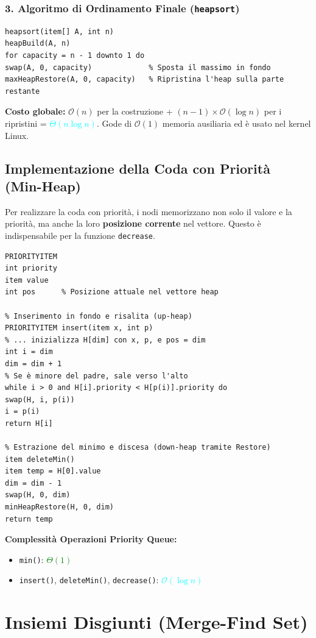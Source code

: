 \documentclass[12pt, a4paper]{article}
\begin{document}
\subsubsection{3. Algoritmo di Ordinamento Finale (\texttt{heapsort})}
\begin{verbatim}
heapsort(item[] A, int n)
heapBuild(A, n)
for capacity = n - 1 downto 1 do
swap(A, 0, capacity)             % Sposta il massimo in fondo
maxHeapRestore(A, 0, capacity)   % Ripristina l'heap sulla parte restante
\end{verbatim}
\textbf{Costo globale:} $\mathcal{O}(n)$ per la costruzione + $(n-1) \times \mathcal{O}(\log n)$ per i ripristini = \textcolor{cyan}{$\Theta(n \log n)$}. Gode di $\mathcal{O}(1)$ memoria ausiliaria ed è usato nel kernel Linux.

\subsection{Implementazione della Coda con Priorità (Min-Heap)}
Per realizzare la coda con priorità, i nodi memorizzano non solo il valore e la priorità, ma anche la loro \textbf{posizione corrente} nel vettore. Questo è indispensabile per la funzione \texttt{decrease}.

\begin{verbatim}
PRIORITYITEM
int priority
item value
int pos      % Posizione attuale nel vettore heap

% Inserimento in fondo e risalita (up-heap)
PRIORITYITEM insert(item x, int p)
% ... inizializza H[dim] con x, p, e pos = dim
int i = dim
dim = dim + 1
% Se è minore del padre, sale verso l'alto
while i > 0 and H[i].priority < H[p(i)].priority do
swap(H, i, p(i))
i = p(i)
return H[i]

% Estrazione del minimo e discesa (down-heap tramite Restore)
item deleteMin()
item temp = H[0].value
dim = dim - 1
swap(H, 0, dim)
minHeapRestore(H, 0, dim)
return temp
\end{verbatim}
\textbf{Complessità Operazioni Priority Queue:}
\begin{itemize}
\item \texttt{min()}: \textcolor{green}{$\Theta(1)$}
\item \texttt{insert()}, \texttt{deleteMin()}, \texttt{decrease()}: \textcolor{cyan}{$\mathcal{O}(\log n)$}
\end{itemize}

\newpage

\section{Insiemi Disgiunti (Merge-Find Set)}
\end{document}
